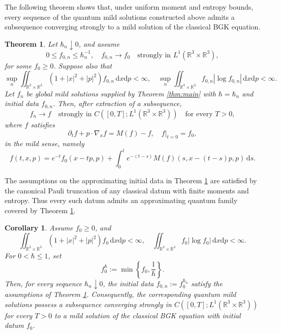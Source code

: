 \documentclass[10pt,reqno]{amsart}
\numberwithin{equation}{section}
\newtheorem{theorem}{Theorem}[section]
\newtheorem{corollary}{Corollary}[section]
\theoremstyle{definition}
\newcommand{\R}{\mathbb R}
\newcommand{\dx}{\mathrm{d}x}
\newcommand{\dpp}{\mathrm{d}p}
\newcommand{\ds}{\mathrm{d}s}
\newcommand{\bq}{\begin{equation}}
\newcommand{\eq}{\end{equation}}
\newcommand{\lt}{\left}
\newcommand{\rt}{\right}
\newcommand{\pa}{\partial}
\begin{document}
The following theorem shows that, under uniform moment and entropy bounds, every sequence of the quantum mild solutions constructed above admits a subsequence converging strongly to a mild solution of the classical BGK equation.

\begin{theorem}\label{thm:semi}
Let $\hbar_n\downarrow0$, and assume
\bq \label{eq:semi-ini-conv}
 0\leq f_{0,n}\leq\hbar_n^{-1},  \quad  f_{0,n}\to f_0  \quad\text{strongly in }L^1(\R^3\times\R^3),
\eq
for some $f_0\geq0$.  Suppose also that
\bq \label{eq:semi-ini-b}
 \sup_n  \iint_{\R^3\times\R^3}  (1+|x|^2+|p|^2)f_{0,n}\,\dx\dpp<\infty,  \quad  \sup_n  \iint_{\R^3\times\R^3}  f_{0,n}|\log f_{0,n}|\,\dx\dpp<\infty.
\eq
Let $f_n$ be global mild solutions supplied by Theorem \ref{thm:main} with $\hbar=\hbar_n$ and initial data $f_{0,n}$.  Then, after extraction of a subsequence,
\bq \label{eq:semi-f-str}
 f_n\to f  \quad\text{strongly in }  C([0,T];L^1(\R^3\times\R^3))  \quad\text{for every }T>0,
\eq
where $f$ satisfies
\[
\pa_t f+p\cdot\nabla_xf=M(f)-f,  \quad  f|_{t=0}=f_0,
\]
in the mild sense, namely
\bq \label{eq:classical-mild}
 f(t,x,p) =e^{-t}f_0(x-tp,p) +\int_0^t e^{-(t-s)}  M(f)(s,x-(t-s)p,p)\,\ds.
\eq
\end{theorem}

The assumptions on the approximating initial data in Theorem \ref{thm:semi} are satisfied by the canonical Pauli truncation of any classical datum with finite moments and entropy.  Thus every such datum admits an approximating quantum family covered by Theorem \ref{thm:semi}.

\begin{corollary}\label{cor:canon}
Assume $f_0\geq0$, and
\[
 \iint_{\R^3\times\R^3}  (1+|x|^2+|p|^2)f_0\,\dx\dpp<\infty,  \quad  \iint_{\R^3\times\R^3}  f_0|\log f_0|\,\dx\dpp<\infty.
\]
For $0<\hbar\leq1$, set
\[
 f_0^\hbar:=\min\lt\{f_0,\frac1\hbar\rt\}.
\]
Then, for every sequence $\hbar_n\downarrow0$, the initial data $f_{0,n}:=f_0^{\hbar_n}$ satisfy the assumptions of Theorem \ref{thm:semi}.  Consequently, the corresponding quantum mild solutions possess a subsequence converging strongly in $C([0,T];L^1(\R^3\times\R^3))$ for every $T>0$ to a mild solution of the classical BGK equation with initial datum $f_0$.
\end{corollary}
\end{document}

